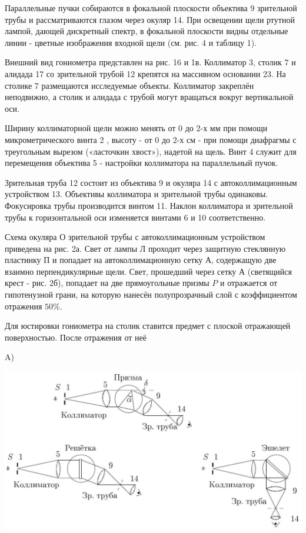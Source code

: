 \documentclass[a4paper,12pt]{article} %
\begin{document}
Параллельные пучки собираются в фокальной плоскости объектива 9 зрительной трубы и рассматриваются глазом через окуляр 14. При освещении щели ртутной лампой, дающей дискретный спектр, в фокальной плоскости видны отдельные линии - цветные изображения входной щели (см. рис. 4 и таблицу 1).

Внешний вид гониометра представлен на рис. 16 и 1в. Коллиматор 3, столик 7 и алидада 17 со зрительной трубой 12 крепятся на массивном основании 23. На столике 7 размещаются исследуемые объекты. Коллиматор закреплён неподвижно, а столик и алидада с трубой могут вращаться вокруг вертикальной оси.

Ширину коллиматорной щели можно менять от 0 до 2-х мм при помощи микрометрического винта 2 , высоту - от 0 до 2-х см - при помощи диафрагмы с треугольным вырезом («ласточкин хвост»), надетой на щель. Винт 4 служит для перемещения объектива 5 - настройки коллиматора на параллельный пучок.

Зрительная труба 12 состоит из объектива 9 и окуляра 14 с автоколлимационным устройством 13. Объективы коллиматора и зрительной трубы одинаковы. Фокусировка трубы производится винтом 11. Наклон коллиматора и зрительной трубы к горизонтальной оси изменяется винтами 6 и 10 соответственно.

Схема окуляра О зрительной трубы с автоколлимационным устройством приведена на рис. 2а. Свет от лампы Л проходит через защитную стеклянную пластинку П и попадает на автоколлимационную сетку А, содержащую две взаимно перпендикулярные щели. Свет, прошедший через сетку А (светящийся крест - рис. 2б), попадает на две прямоугольные призмы $P$ и отражается от гипотенузной грани, на которую нанесён полупрозрачный слой с коэффициентом отражения $50 \%$.

Для юстировки гониометра на столик ставится предмет с плоской отражающей поверхностью. После отражения от неё 

A)
\begin{center}
    \includegraphics[scale=0.2]{2023_04_02_a48ae02e429ba186bcd7g-2}
\end{center}
\end{document}
